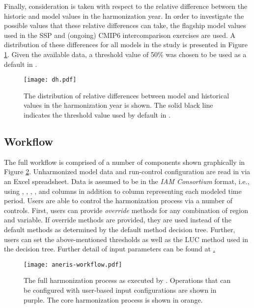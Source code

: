 Finally, consideration is taken with respect to the relative difference between
the historic and model values in the harmonization year. In order to investigate
the possible values that these relative differences can take, the flagship model
values used in the SSP  and (ongoing) CMIP6 intercomparison exercises
are used. A distribution of these differences for all models in the study is
presented in Figure \ref{fig:dh}. Given the available data, a threshold value of
50\% was chosen to be used as a default in .

\begin{figure}
  \begin{center}
    \texttt{[image: dh.pdf]}
    \caption[]{
      \label{fig:dh}
      The distribution of relative differences between model and historical
      values in the harmonization year is shown. The solid black line indicates
      the threshold value used by default in .  
    }
  \end{center}
\end{figure}

\subsection{ Workflow}

The full  workflow is comprised of a number of components shown
graphically in Figure \ref{fig:workflow}. Unharmonized model data and
run-control configuration are read in via an Excel spreadsheet. Data is assumed
to be in the \textit{IAM Consortium} format, i.e., using ,
, , , and  columns in
addition to column representing each modeled time period. Users are able to
control the harmonization process via a number of controls. First, users can
provide \textit{override} methods for any combination of region and variable. If
override methods are provided, they are used instead of the default methods as
determined by the default method decision tree. Further, users can set the
above-mentioned thresholds as well as the LUC method used in the decision
tree. Further detail of input parameters can be found at
\hyperlink{http://aneris.readthedocs.io/en/latest/}.

\begin{figure}
  \begin{center}
    \texttt{[image: aneris-workflow.pdf]}
    \caption[]{
      \label{fig:workflow}
      The full harmonization process as executed by . Operations
      that can be configured with user-based input configurations are shown in
      purple. The core harmonization process is shown in orange.  }
  \end{center}
\end{figure}

